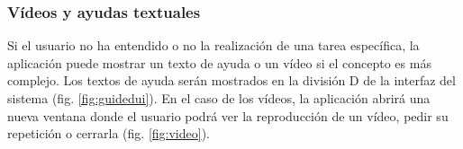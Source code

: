 \subsubsection{Vídeos y ayudas textuales}

Si el usuario no ha entendido o no   la realización de una tarea específica, la aplicación puede mostrar un texto de ayuda o un vídeo si el concepto es más complejo. Los textos de ayuda serán mostrados en la división D de la interfaz del sistema (fig. \ref{fig:guidedui}). En el caso de los vídeos, la aplicación abrirá una nueva ventana donde el usuario podrá ver la reproducción de un vídeo, pedir su repetición o cerrarla (fig. \ref{fig:video}).



